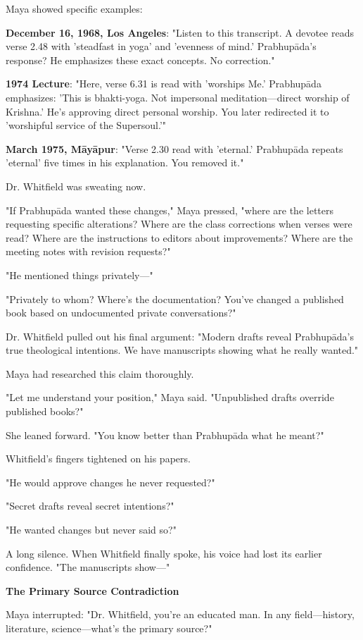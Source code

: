 \documentclass[12pt,twoside]{book}
\begin{document}
Maya showed specific examples:

\textbf{\textbf{December 16, 1968, Los Angeles}}: "Listen to this transcript. A devotee reads verse 2.48 with 'steadfast in yoga' and 'evenness of mind.' Prabhupāda's response? He emphasizes these exact concepts. No correction."

\textbf{\textbf{1974 Lecture}}: "Here, verse 6.31 is read with 'worships Me.' Prabhupāda emphasizes: 'This is bhakti-yoga. Not impersonal meditation—direct worship of Krishna.' He's approving direct personal worship. You later redirected it to 'worshipful service of the Supersoul.'"

\textbf{\textbf{March 1975, Māyāpur}}: "Verse 2.30 read with 'eternal.' Prabhupāda repeats 'eternal' five times in his explanation. You removed it."

Dr. Whitfield was sweating now.

"If Prabhupāda wanted these changes," Maya pressed, "where are the letters requesting specific alterations? Where are the class corrections when verses were read? Where are the instructions to editors about improvements? Where are the meeting notes with revision requests?"

"He mentioned things privately—"

"Privately to whom? Where's the documentation? You've changed a published book based on undocumented private conversations?"

Dr. Whitfield pulled out his final argument: "Modern drafts reveal Prabhupāda's true theological intentions. We have manuscripts showing what he really wanted."

Maya had researched this claim thoroughly.

"Let me understand your position," Maya said. "Unpublished drafts override published books?"

She leaned forward. "You know better than Prabhupāda what he meant?"

Whitfield's fingers tightened on his papers.

"He would approve changes he never requested?"

"Secret drafts reveal secret intentions?"

"He wanted changes but never said so?"

A long silence. When Whitfield finally spoke, his voice had lost its earlier confidence. "The manuscripts show—"

\textbf{\textbf{The Primary Source Contradiction}}

Maya interrupted: "Dr. Whitfield, you're an educated man. In any field—history, literature, science—what's the primary source?"
\end{document}
